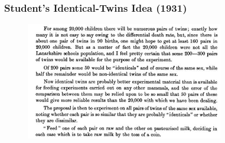 \documentclass[slides]{beamer} %
\begin{document}
\begin{frame}
	\frametitle{Student's Identical-Twins Idea (1931)}

\begin{figure}[htp]
\centering
\includegraphics[width=3.4in]{images/student.jpg}
\end{figure}

\end{frame}
\end{document}
